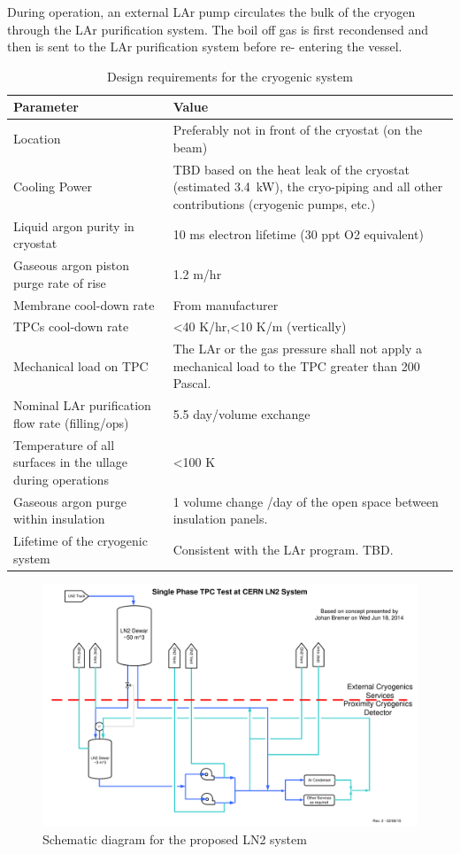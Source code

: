 During operation, an external LAr pump circulates the bulk of the cryogen through the LAr purification 
system. The boil off gas is first recondensed and then is sent to the LAr purification system before re-
entering the vessel.

\begin{table}[htpb]
\caption{Design requirements for the cryogenic system}
\label{tbl:cryo-design-parameters}
\centering
\begin{tabular}{|p{}|p{}|}
\hline
 \textbf{ Parameter} & \textbf{Value} \\ \hline
 Location & Preferably not in front of the cryostat (on the beam) \\ \hline
 Cooling Power & TBD based on the heat leak of the cryostat (estimated 3.4~kW), the cryo-piping and all other contributions (cryogenic pumps, etc.) \\ \hline
 Liquid argon purity in cryostat & 10 ms electron lifetime (30 ppt O2 equivalent) \\  \hline
 Gaseous argon piston purge rate of rise & 1.2 m/hr \\ \hline
 Membrane cool-down rate & From manufacturer \\  \hline
 TPCs cool-down rate & \textless40 K/hr,\textless10 K/m (vertically)
 \\ \hline
Mechanical load on TPC & The LAr or the gas pressure shall not apply a mechanical load to the TPC greater than 200 Pascal. \\ \hline
Nominal LAr purification flow rate (filling/ops) & 5.5 day/volume exchange \\ \hline
 Temperature of all surfaces in the ullage during operations & \textless100 K \\  \hline
 Gaseous argon purge within insulation & 1 volume change /day of the open space between insulation panels. \\ \hline
 Lifetime of the cryogenic system & Consistent with the LAr program. TBD. \\ \hline
\end{tabular}
\end{table}

\begin{figure}
\begin{center}
\includegraphics[width=.75\textwidth]{figures/proposed-LN2-system} %
\caption[Schematic diagram for the proposed LN2 system]{\label{fig:proposed-LN2-system}Schematic diagram for the proposed LN2 system}
\end{center}
\end{figure}

